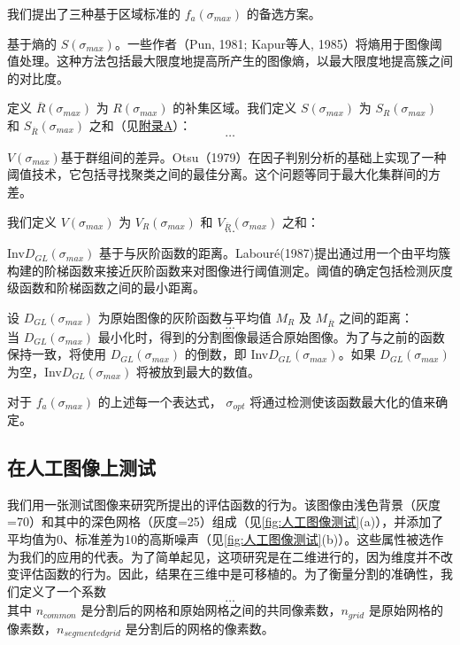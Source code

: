 我们提出了三种基于区域标准的 $f_{a}(\sigma_{max})$ 的备选方案。

基于熵的 $S(\sigma_{max})$。一些作者（Pun, 1981\cite{pun1981entropic}; Kapur等人, 1985\cite{kapur1985new}）将熵用于图像阈值处理。这种方法包括最大限度地提高所产生的图像熵，以最大限度地提高簇之间的对比度。

定义 $\overline{R}(\sigma_{max})$ 为 $R(\sigma_{max})$ 的补集区域。我们定义 $S(\sigma_{max})$ 为 $S_{R}(\sigma_{max})$ 和 $S_{\overline{R}}(\sigma_{max})$ 之和（见\hyperref[sec:appendix_a]{附录A}）：
\begin{equation}
    \dots
\end{equation}

$V(\sigma_{max})$基于群组间的差异。Otsu（1979）\cite{otsu1979threshold}在因子判别分析的基础上实现了一种阈值技术，它包括寻找聚类之间的最佳分离。这个问题等同于最大化集群间的方差。

我们定义 $V(\sigma_{max})$ 为 $V_{R}(\sigma_{max})$ 和 $V_{\overline{R}}(\sigma_{max})$ 之和：
\begin{equation}
    \dots
\end{equation}

Inv$D_{GL}(\sigma_{max})$ 基于与灰阶函数的距离。Labouré(1987)\cite{laboure1987feasibility}提出通过用一个由平均簇构建的阶梯函数来接近灰阶函数来对图像进行阈值测定。阈值的确定包括检测灰度级函数和阶梯函数之间的最小距离。

设 $D_{GL}(\sigma_{max})$ 为原始图像的灰阶函数与平均值 $M_R$ 及 $M_{\overline{R}}$ 之间的距离：
\begin{equation}
    \dots
\end{equation}
当 $D_{GL}(\sigma_{max})$ 最小化时，得到的分割图像最适合原始图像。为了与之前的函数保持一致，将使用 $D_{GL}(\sigma_{max})$ 的倒数，即 Inv$D_{GL}(\sigma_{max})$。如果 $D_{GL}(\sigma_{max})$ 为空，Inv$D_{GL}(\sigma_{max})$ 将被放到最大的数值。

对于 $f_{a}(\sigma_{max})$ 的上述每一个表达式， $\sigma_{opt}$ 将通过检测使该函数最大化的值来确定。

\subsection{在人工图像上测试}\label{sec:test}

我们用一张测试图像来研究所提出的评估函数的行为。该图像由浅色背景（灰度=70）和其中的深色网格（灰度=25）组成（见\cref{fig:人工图像测试}(a)），并添加了平均值为0、标准差为10的高斯噪声（见\cref{fig:人工图像测试}(b)）。这些属性被选作为我们的应用的代表。为了简单起见，这项研究是在二维进行的，因为维度并不改变评估函数的行为。因此，结果在三维中是可移植的。为了衡量分割的准确性，我们定义了一个系数
\begin{equation}
    \dots
\end{equation}
其中 $n_{common}$ 是分割后的网格和原始网格之间的共同像素数，$n_{grid}$ 是原始网格的像素数，$n_{segmented grid}$ 是分割后的网格的像素数。


